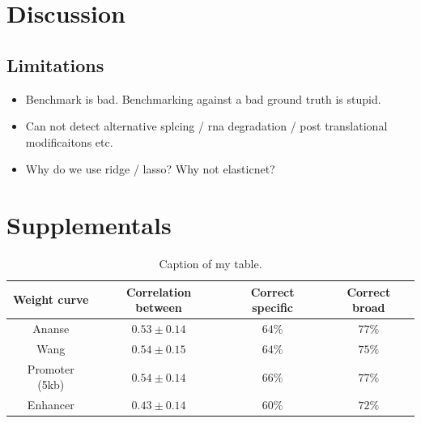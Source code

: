 \section{Discussion}

\subsection{Limitations}
\begin{itemize}
    \item Benchmark is bad. Benchmarking against a bad ground truth is stupid.
    \item Can not detect alternative splcing / rna degradation / post translational modificaitons etc.
    \item Why do we use ridge / lasso? Why not elasticnet?
\end{itemize}

\section{Supplementals}
\beginsupplement
\begin{table}
\begin{center}
\begin{tabular}{||c c c c||} 
\hline
Weight curve & Correlation between & Correct specific & Correct broad \\[0.5ex] 
\hline
Ananse & $0.53 \pm 0.14$ & $64\%$ & $77\%$ \\ 
\hline
Wang & $0.54 \pm 0.15 $ & $64\%$ & $75\%$ \\
\hline
Promoter (5kb) & $0.54 \pm 0.14$ & $66\%$ & $77\%$ \\
\hline
Enhancer & $0.43 \pm 0.14$ & $60\%$ & $72\%$ \\
\hline
\end{tabular}
\caption{Caption of my table.}
\label{table:1}
\end{center}
\end{table}
